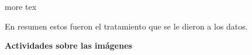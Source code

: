 more tex



En resumen estos fueron el tratamiento que se le dieron a los datos.

\textbf{Actividades sobre las imágenes}

